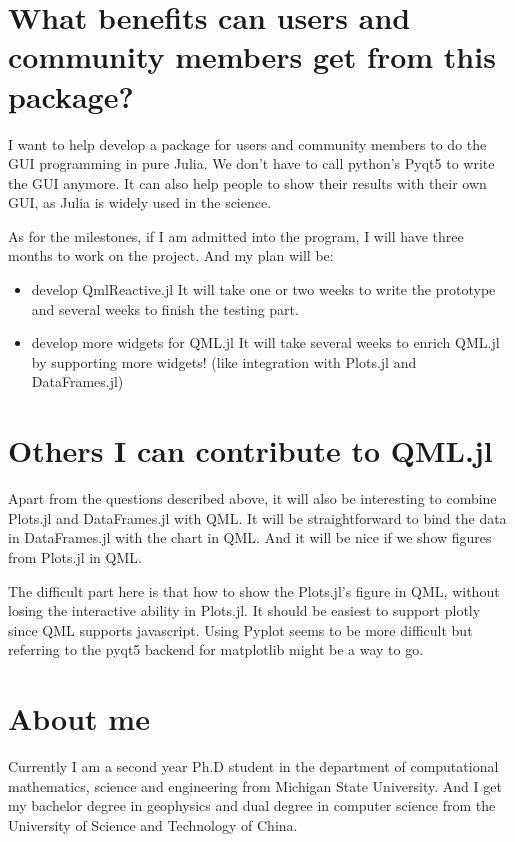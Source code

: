 \documentclass[12pt]{extarticle}
\begin{document}
\section{What benefits can users and community members get from this package?}

I want to help develop a package for users and community members to do the GUI programming in pure Julia. We don't have to call 
python's Pyqt5 to write the GUI anymore. It can also help people to show their results with their own GUI, as Julia is widely used
in the science.

As for the milestones, if I am admitted into the program, I will have three months to work on the project. And my plan will be:
\begin{itemize}
    \item{develop QmlReactive.jl} It will take one or two weeks to write the prototype and several weeks to finish the testing part. 
    \item{develop more widgets for QML.jl} It will take several weeks to enrich QML.jl by supporting more widgets! (like integration with Plots.jl and DataFrames.jl)
\end{itemize}

\section{Others I can contribute to QML.jl}

Apart from the questions described above, it will also be interesting to combine Plots.jl and DataFrames.jl with QML. It will be 
straightforward to bind the data in DataFrames.jl with the chart in QML. And it will be nice if we show figures from Plots.jl in 
QML.

The difficult part here is that how to show the Plots.jl's figure in QML, without losing the interactive ability 
in Plots.jl. It should be easiest to support plotly since QML supports javascript. Using Pyplot seems to be more 
difficult but referring to the pyqt5 backend for matplotlib might be a way to go.

\section{About me}

Currently I am a second year Ph.D student in the department of computational mathematics, science and engineering from Michigan State University.
And I get my bachelor degree in geophysics and dual degree in computer science from the University of Science and Technology of China.
\end{document}
